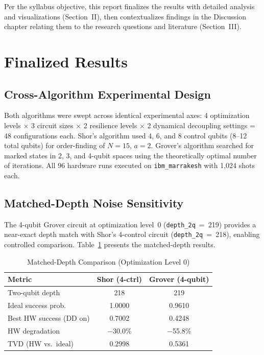 \documentclass[conference]{IEEEtran}
\begin{document}
Per the syllabus objective, this report finalizes the results with detailed analysis and visualizations (Section~II), then contextualizes findings in the Discussion chapter relating them to the research questions and literature (Section~III).

\section{Finalized Results}

\subsection{Cross-Algorithm Experimental Design}

Both algorithms were swept across identical experimental axes: 4 optimization levels $\times$ 3 circuit sizes $\times$ 2 resilience levels $\times$ 2 dynamical decoupling settings = 48 configurations each. Shor's algorithm used 4, 6, and 8 control qubits (8--12 total qubits) for order-finding of $N=15$, $a=2$. Grover's algorithm searched for marked states in 2, 3, and 4-qubit spaces using the theoretically optimal number of iterations. All 96 hardware runs executed on \texttt{ibm\_marrakesh} with 1,024 shots each.

\subsection{Matched-Depth Noise Sensitivity}

The 4-qubit Grover circuit at optimization level~0 (\texttt{depth\_2q}~=~219) provides a near-exact depth match with Shor's 4-control circuit (\texttt{depth\_2q}~=~218), enabling controlled comparison. Table~\ref{tab:matched} presents the matched-depth results.

\begin{table}[htbp]
\caption{Matched-Depth Comparison (Optimization Level 0)}
\begin{center}
\begin{tabular}{lcc}
\toprule
\textbf{Metric} & \textbf{Shor (4-ctrl)} & \textbf{Grover (4-qubit)} \\
\midrule
Two-qubit depth & 218 & 219 \\
Ideal success prob. & 1.0000 & 0.9610 \\
Best HW success (DD on) & 0.7002 & 0.4248 \\
HW degradation & $-$30.0\% & $-$55.8\% \\
TVD (HW vs.\ ideal) & 0.2998 & 0.5361 \\
\bottomrule
\end{tabular}
\label{tab:matched}
\end{center}
\end{table}
\end{document}

